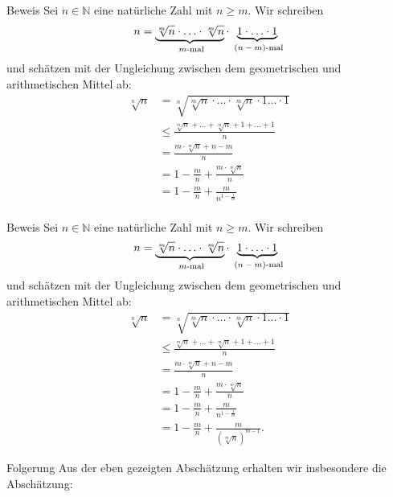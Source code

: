 \documentclass[10pt]{beamer}
\def\bN{\mathbb{N}}
\begin{document}
\begin{frame}{Beweis}
    Sei \( n \in \bN \) eine natürliche Zahl mit \( n \geq m \). Wir schreiben 
    \[
        n = \underbrace{\sqrt[m]{n} \cdot \ldots \cdot \sqrt[m]{n}}_{\text{ \( m \)-mal}} \cdot \underbrace{1 \cdot \ldots \cdot 1}_{\text{ \( \left( n - m \right) \)-mal}} 
    \]
    und schätzen mit der Ungleichung zwischen dem geometrischen und arithmetischen Mittel ab:
    \begin{align*}
        \sqrt[n]{n}
        & =\sqrt[n]{\sqrt[m]{n} \cdot \ldots \cdot \sqrt[m]{n} \cdot 1 \ldots \cdot 1} \\
        & \leq \frac{\sqrt[m]{n} + \ldots + \sqrt[m]{n} + 1 + \ldots + 1}{n} \\
        & = \frac{m \cdot \sqrt[m]{n} + n - m}{n} \\
        & = 1 - \frac{m}{n} + \frac{m \cdot \sqrt[m]{n}}{n} \\
        & = 1 - \frac{m}{n} + \frac{m}{n^{1 - \frac{1}{m}}} \\
    \end{align*}
\end{frame}



\begin{frame}{Beweis}
    Sei \( n \in \bN \) eine natürliche Zahl mit \( n \geq m \). Wir schreiben 
    \[
        n = \underbrace{\sqrt[m]{n} \cdot \ldots \cdot \sqrt[m]{n}}_{\text{ \( m \)-mal}} \cdot \underbrace{1 \cdot \ldots \cdot 1}_{\text{ \( \left( n - m \right) \)-mal}} 
    \]
    und schätzen mit der Ungleichung zwischen dem geometrischen und arithmetischen Mittel ab:
    \begin{align*}
        \sqrt[n]{n}
        & =\sqrt[n]{\sqrt[m]{n} \cdot \ldots \cdot \sqrt[m]{n} \cdot 1 \ldots \cdot 1} \\
        & \leq \frac{\sqrt[m]{n} + \ldots + \sqrt[m]{n} + 1 + \ldots + 1}{n} \\
        & = \frac{m \cdot \sqrt[m]{n} + n - m}{n} \\
        & = 1 - \frac{m}{n} + \frac{m \cdot \sqrt[m]{n}}{n} \\
        & = 1 - \frac{m}{n} + \frac{m}{n^{1 - \frac{1}{m}}} \\
        & = 1 - \frac{m}{n} + \frac{m}{\left( \sqrt[m]{n} \right)^{m - 1}}.
    \end{align*}
\end{frame}



\begin{frame}{Folgerung}
    Aus der eben gezeigten Abschätzung erhalten wir insbesondere die Abschätzung:
\end{frame}
\end{document}
